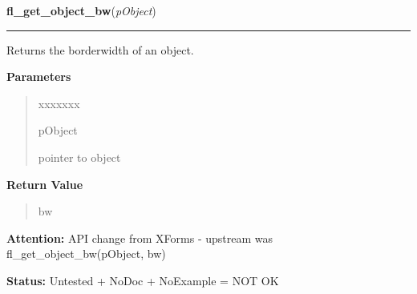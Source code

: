 \hspace{.8\funcindent}\begin{boxedminipage}{\funcwidth}

    \raggedright \textbf{fl\_get\_object\_bw}(\textit{pObject})

    \vspace{-1.5ex}

    \rule{\textwidth}{0.5\fboxrule}
\setlength{\parskip}{2ex}
    Returns the borderwidth of an object.

\setlength{\parskip}{1ex}
      \textbf{Parameters}
      \vspace{-1ex}

      \begin{quote}
        \begin{Ventry}{xxxxxxx}

          \item[pObject]

          pointer to object

        \end{Ventry}

      \end{quote}

      \textbf{Return Value}
    \vspace{-1ex}

      \begin{quote}
      bw

      \end{quote}

\textbf{Attention:} API change from XForms - upstream was fl\_get\_object\_bw(pObject, bw)



\textbf{Status:} Untested + NoDoc + NoExample = NOT OK



    \end{boxedminipage}

    \label{xformslib:library:fl_set_object_resize}

    \vspace{0.5ex}

